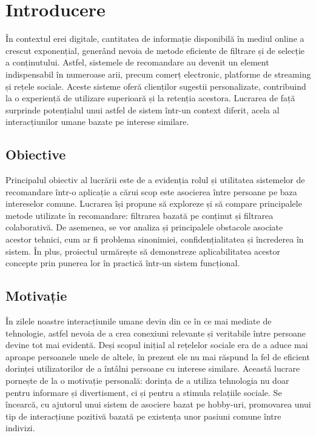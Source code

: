 \chapter{Introducere}
\label{intro}
În contextul erei digitale, cantitatea de informație disponibilă în mediul online a crescut exponențial, generând nevoia de metode eficiente de filtrare și de selecție a conținutului.
Astfel, sistemele de recomandare au devenit un element indispensabil în numeroase arii, precum comerț electronic, platforme de streaming și rețele sociale.
Aceste sisteme oferă clienților sugestii personalizate, contribuind la o experiență de utilizare superioară și la retenția acestora.
Lucrarea de față surprinde potențialul unui astfel de sistem într-un context diferit, acela al interacțiunilor umane bazate pe interese similare.


\section{Obiective}
\label{section:ch1sec1}
Principalul obiectiv al lucrării este de a evidenția rolul și utilitatea sistemelor de recomandare într-o aplicație a cărui scop este asocierea între persoane pe baza intereselor comune.
Lucrarea își propune să exploreze și să compare principalele metode utilizate în recomandare: filtrarea bazată pe conținut și filtrarea colaborativă.
De asemenea, se vor analiza și principalele obstacole asociate acestor tehnici, cum ar fi problema sinonimiei, confidențialitatea și încrederea în sistem.
În plus, proiectul urmărește să demonstreze aplicabilitatea acestor concepte prin punerea lor în practică într-un sistem funcțional.

\section{Motivație}
\label{section:ch1sec2}
În zilele noastre interacțiunile umane devin din ce în ce mai mediate de tehnologie, astfel nevoia de a crea conexiuni relevante și veritabile între persoane devine tot mai evidentă.
Deși scopul inițial al rețelelor sociale era de a aduce mai aproape persoanele unele de altele, în prezent ele nu mai răspund la fel de eficient dorinței utilizatorilor de a întâlni persoane cu interese similare.
Această lucrare pornește de la o motivație personală: dorința de a utiliza tehnologia nu doar pentru informare și divertisment, ci și pentru a stimula relațiile sociale.
Se încearcă, cu ajutorul unui sistem de asociere bazat pe hobby-uri, promovarea unui tip de interacțiune pozitivă bazată pe existența unor pasiuni comune între indivizi.

